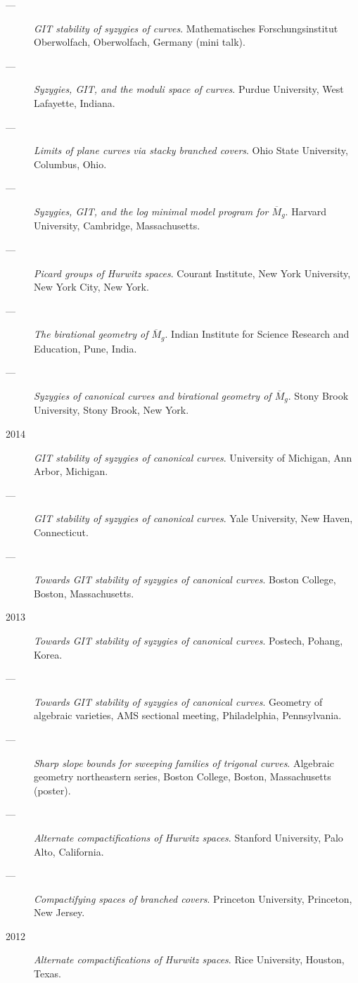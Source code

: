 \documentclass[11pt]{article}
\begin{document}
\begin{description}
\item[{---}] \emph{GIT stability of syzygies of curves}. Mathematisches Forschungsinstitut Oberwolfach, Oberwolfach, Germany (mini talk).
\item[{---}] \emph{Syzygies, GIT, and the moduli space of curves}. Purdue University, West Lafayette, Indiana.
\item[{---}] \emph{Limits of plane curves via stacky branched covers}. Ohio State University, Columbus, Ohio.
\item[{---}] \emph{Syzygies, GIT, and the log minimal model program for \(\overline{M}_g\)}. Harvard University, Cambridge, Massachusetts.
\item[{---}] \emph{Picard groups of Hurwitz spaces}. Courant Institute, New York University, New York City, New York.
\item[{---}] \emph{The birational geometry of \(\overline M_g\)}. Indian Institute for Science Research and Education, Pune, India.
\item[{---}] \emph{Syzygies of canonical curves and birational geometry of \(\overline M_g\)}. Stony Brook University, Stony Brook, New York.
\item[{2014}] \emph{GIT stability of syzygies of canonical curves}. University of Michigan, Ann Arbor, Michigan.
\item[{---}] \emph{GIT stability of syzygies of canonical curves}. Yale University, New Haven, Connecticut.
\item[{---}] \emph{Towards GIT stability of syzygies of canonical curves}. Boston College, Boston, Massachusetts.
\item[{2013}] \emph{Towards GIT stability of syzygies of canonical curves}. Postech, Pohang, Korea.
\item[{---}] \emph{Towards GIT stability of syzygies of canonical curves}. Geometry of algebraic varieties, AMS sectional meeting, Philadelphia, Pennsylvania.
\item[{---}] \emph{Sharp slope bounds for sweeping families of trigonal curves}. Algebraic geometry northeastern series, Boston College, Boston, Massachusetts (poster).
\item[{---}] \emph{Alternate compactifications of Hurwitz spaces}. Stanford University, Palo Alto, California.
\item[{---}] \emph{Compactifying spaces of branched covers}. Princeton University, Princeton, New Jersey.
\item[{2012}] \emph{Alternate compactifications of Hurwitz spaces}. Rice University, Houston, Texas.

\end{description}
\end{document}

